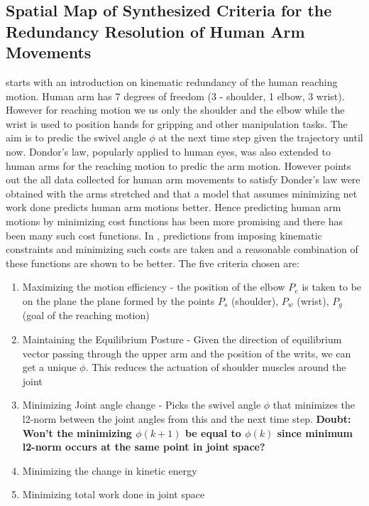 \documentclass{article}[11pt]
\begin{document}
\subsection{Spatial Map of Synthesized Criteria for the Redundancy Resolution of Human Arm Movements}
\cite{li2015spatial} starts with an introduction on kinematic redundancy of the human reaching motion. Human arm has 7 degrees of freedom (3 - shoulder, 1 elbow, 3 wrist). However for reaching motion we us only the shoulder and the elbow while the wrist is used to position hands for gripping and other manipulation tasks. The aim is to predic the swivel angle $\phi$ at the next time step given the trajectory until now. Dondor's law, popularly applied to human eyes, was also extended to human arms for the reaching motion to predic the arm motion. However \cite{soechting1995moving} points out the all data collected for human arm movements to satisfy Donder's law were obtained with the arms stretched and that a model that assumes minimizing net work done predicts human arm motions better. Hence predicting human arm motions by minimizing cost functions has been more promising and there has been many such cost functions. In \cite{li2015spatial}, predictions from imposing kinematic constraints and minimizing such costs are taken and a reasonable combination of these functions are shown to be better. The five criteria chosen are:
\begin{enumerate}
\item Maximizing the motion efficiency - the position of the elbow $P_e$ is taken to be on the plane the plane formed by the points $P_s$ (shoulder), $P_w$ (wrist), $P_g$ (goal of the reaching motion)
\item Maintaining the Equilibrium Posture - Given the direction of equilibrium vector passing through the upper arm and the position of the writs, we can get a unique $\phi$. This reduces the actuation of shoulder muscles around the joint
\item Minimizing Joint angle change - Picks the swivel angle $\phi$ that minimizes the l2-norm between the joint angles from this and the next time step. \textbf{Doubt: Won't the minimizing $\phi(k+1)$ be equal to $\phi(k)$ since minimum l2-norm occurs at the same point in joint space?}
\item Minimizing the change in kinetic energy
\item Minimizing total work done in joint space
\end{enumerate} 
\end{document}
